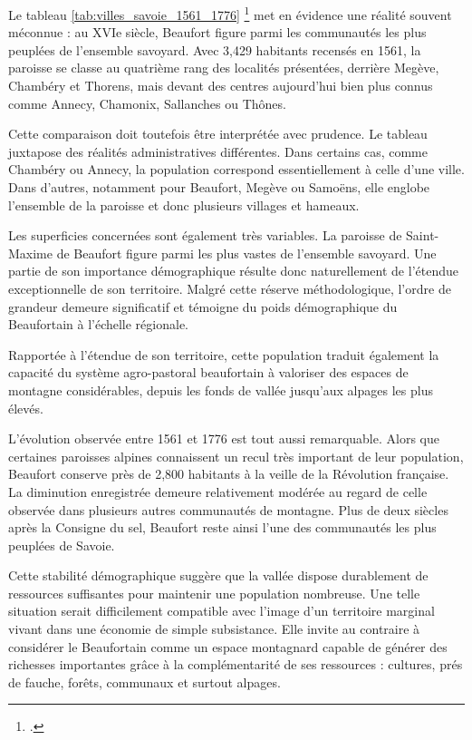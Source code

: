 \documentclass[12pt,a4paper]{report}
\begin{document}
Le tableau \ref{tab:villes_savoie_1561_1776} \footcite[37]{Gachet2011GabelleSel1561} met en évidence une réalité souvent méconnue : au XVIe siècle, Beaufort figure parmi les communautés les plus peuplées de l'ensemble savoyard. Avec 3,429 habitants recensés en 1561, la paroisse se classe au quatrième rang des localités présentées, derrière Megève, Chambéry et Thorens, mais devant des centres aujourd'hui bien plus connus comme Annecy, Chamonix, Sallanches ou Thônes.

Cette comparaison doit toutefois être interprétée avec prudence. Le tableau juxtapose des réalités administratives différentes. Dans certains cas, comme Chambéry ou Annecy, la population correspond essentiellement à celle d'une ville. Dans d'autres, notamment pour Beaufort, Megève ou Samoëns, elle englobe l'ensemble de la paroisse et donc plusieurs villages et hameaux.

Les superficies concernées sont également très variables. La paroisse de Saint-Maxime de Beaufort figure parmi les plus vastes de l'ensemble savoyard. Une partie de son importance démographique résulte donc naturellement de l'étendue exceptionnelle de son territoire. Malgré cette réserve méthodologique, l'ordre de grandeur demeure significatif et témoigne du poids démographique du Beaufortain à l'échelle régionale.

Rapportée à l'étendue de son territoire, cette population traduit également la capacité du système agro-pastoral beaufortain à valoriser des espaces de montagne considérables, depuis les fonds de vallée jusqu'aux alpages les plus élevés.

\vspace{1em}

L'évolution observée entre 1561 et 1776 est tout aussi remarquable. Alors que certaines paroisses alpines connaissent un recul très important de leur population, Beaufort conserve près de 2,800 habitants à la veille de la Révolution française. La diminution enregistrée demeure relativement modérée au regard de celle observée dans plusieurs autres communautés de montagne. Plus de deux siècles après la Consigne du sel, Beaufort reste ainsi l'une des communautés les plus peuplées de Savoie.

Cette stabilité démographique suggère que la vallée dispose durablement de ressources suffisantes pour maintenir une population nombreuse. Une telle situation serait difficilement compatible avec l'image d'un territoire marginal vivant dans une économie de simple subsistance. Elle invite au contraire à considérer le Beaufortain comme un espace montagnard capable de générer des richesses importantes grâce à la complémentarité de ses ressources : cultures, prés de fauche, forêts, communaux et surtout alpages.
\end{document}
